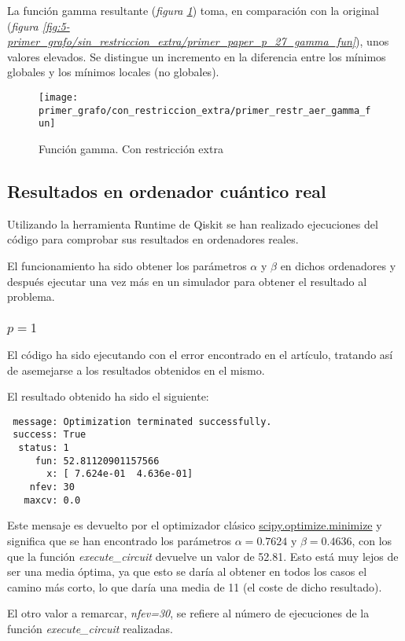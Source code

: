 \documentclass{article}
\begin{document}
La función gamma resultante (\textit{figura \ref{fig:5-primer_grafo/con_restriccion_extra/primer_restr_aer_gamma_fun}}) toma, en comparación con la original (\textit{figura \ref{fig:5-primer_grafo/sin_restriccion_extra/primer_paper_p_27_gamma_fun}}), unos valores elevados. Se distingue un incremento en la diferencia entre los mínimos globales y los mínimos locales (no globales).
\begin{figure}[htbp]
  \centering
  \texttt{[image: primer\_grafo/con\_restriccion\_extra/primer\_restr\_aer\_gamma\_fun]}
  \caption{Función gamma. Con restricción extra}
  \label{fig:5-primer_grafo/con_restriccion_extra/primer_restr_aer_gamma_fun}
\end{figure}
\subsection{Resultados en ordenador cuántico real}
Utilizando la herramienta Runtime de Qiskit se han realizado ejecuciones del código para comprobar sus resultados en ordenadores reales.

El funcionamiento ha sido obtener los parámetros \(\alpha\) y \(\beta\) en dichos ordenadores y después ejecutar una vez más en un simulador para obtener el resultado al problema.
\subsubsection{\(p = 1\)}
El código ha sido ejecutando con el error encontrado en el artículo, tratando así de asemejarse a los resultados obtenidos en el mismo.

El resultado obtenido ha sido el siguiente:
\begin{verbatim}
 message: Optimization terminated successfully.
 success: True
  status: 1
     fun: 52.81120901157566
       x: [ 7.624e-01  4.636e-01]
    nfev: 30
   maxcv: 0.0
\end{verbatim}
Este mensaje es devuelto por el optimizador clásico \href{https://docs.scipy.org/doc/scipy/reference/generated/scipy.optimize.minimize.html}{scipy.optimize.minimize} y significa que se han encontrado los parámetros \(\alpha = 0.7624 \text{ y } \beta = 0.4636\), con los que la función \textit{execute\_circuit} devuelve un valor de 52.81. Esto está muy lejos de ser una media óptima, ya que esto se daría al obtener en todos los casos el camino más corto, lo que daría una media de 11 (el coste de dicho resultado).

El otro valor a remarcar, \textit{nfev=30}, se refiere al número de ejecuciones de la función \textit{execute\_circuit} realizadas.
\end{document}
